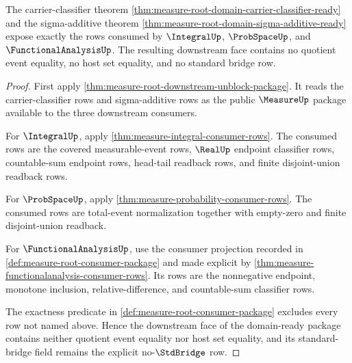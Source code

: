 \begin{theorem}
\label{thm:measure-root-domain-downstream-ready}
The carrier-classifier theorem
\autoref{thm:measure-root-domain-carrier-classifier-ready} and the
sigma-additive theorem
\autoref{thm:measure-root-domain-sigma-additive-ready} expose exactly the
rows consumed by $\IntegralUp$, $\ProbSpaceUp$, and
$\FunctionalAnalysisUp$. The resulting downstream face contains no quotient
event equality, no host set equality, and no standard bridge row.
\end{theorem}
\begin{proof}
First apply \autoref{thm:measure-root-downstream-unblock-package}. It reads
the carrier-classifier rows and sigma-additive rows as the public
$\MeasureUp$ package available to the three downstream consumers.

For $\IntegralUp$, apply \autoref{thm:measure-integral-consumer-rows}. The
consumed rows are the covered measurable-event rows, $\RealUp$ endpoint
classifier rows, countable-sum endpoint rows, head-tail readback rows, and
finite disjoint-union readback rows.

For $\ProbSpaceUp$, apply \autoref{thm:measure-probability-consumer-rows}.
The consumed rows are total-event normalization together with empty-zero and
finite disjoint-union readback.

For $\FunctionalAnalysisUp$, use the consumer projection recorded in
\autoref{def:measure-root-consumer-package} and made explicit by
\autoref{thm:measure-functionalanalysis-consumer-rows}. Its rows are the
nonnegative endpoint, monotone inclusion, relative-difference, and
countable-sum classifier rows.

The exactness predicate in \autoref{def:measure-root-consumer-package}
excludes every row not named above. Hence the downstream face of the
domain-ready package contains neither quotient event equality nor host set
equality, and its standard-bridge field remains the explicit no-$\StdBridge$
row.
\end{proof}

